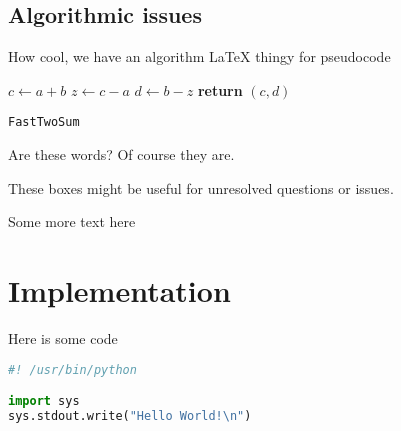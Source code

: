 \documentclass{article}
\begin{document}

\subsection{Algorithmic issues}

How cool, we have an algorithm LaTeX thingy for pseudocode

\begin{center}
	\begin{minipage}{0.5\linewidth} %
		\begin{algorithm}[H]
			\medskip
			$c \leftarrow a + b$ \;
			$z \leftarrow c - a$ \;
			$d \leftarrow b - z$ \;
			{\bf return} $(c,d)$ \;
			\caption{\texttt{FastTwoSum}} %
			\label{alg:fastTwoSum}   %
		\end{algorithm}
	\end{minipage}
\end{center}

Are these words? Of course they are. 

\begin{question}
These boxes might be useful for unresolved questions or issues.
\end{question}

Some more text here 


\section{Implementation}

Here is some code

\begin{file}[hello.py]
\begin{lstlisting}[language=Python]
#! /usr/bin/python

import sys
sys.stdout.write("Hello World!\n")
\end{lstlisting}
\end{file}
\end{document}
